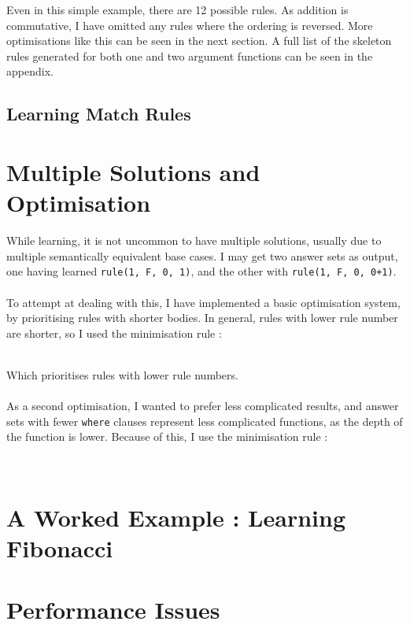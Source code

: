Even in this simple example, there are 12 possible rules. As addition is commutative, I have omitted any rules where the ordering is reversed. More optimisations like this can be seen in the next section.
A full list of the skeleton rules generated for both one and two argument functions can be seen in the appendix.

\subsection{Learning Match Rules}


\section{Multiple Solutions and Optimisation}
While learning, it is not uncommon to have multiple solutions, usually due to multiple semantically equivalent base cases. I may get two answer sets as output, one having learned \lstinline{rule(1, F, 0, 1)}, and the other with \lstinline{rule(1, F, 0, 0+1)}. \\ \\
To attempt at dealing with this, I have implemented a basic optimisation system, by prioritising rules with shorter bodies. In general, rules with lower rule number are shorter, so I used the minimisation rule :


\mbox{}\\
Which prioritises rules with lower rule numbers.\\ \\
As a second optimisation, I wanted to prefer less complicated results, and answer sets with fewer \lstinline{where} clauses represent less complicated functions, as the depth of the function is lower. Because of this, I use the minimisation rule : %


\mbox{}\\

\section{A Worked Example : Learning Fibonacci}

\section{Performance Issues}
\pagebreak
%
%